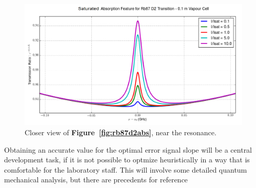 \begin{figure}[!hrt]
  \centering
  \includegraphics[scale=0.5]{rb_D2_single_absorption_resonance.png}
  \caption{Closer view of \textbf{Figure~\ref{fig:rb87d2abs}}, near the
  resonance.}
  \label{fig:rb87d2abs_closer}
\end{figure}

Obtaining an accurate value for the optimal error signal slope will be a central
development task, if it is not possible to optmize heuristically in a way that
is comfortable for the laboratory staff. This will involve some detailed
quantum mechanical analysis, but there are precedents for reference
\cite{maguire2006}

